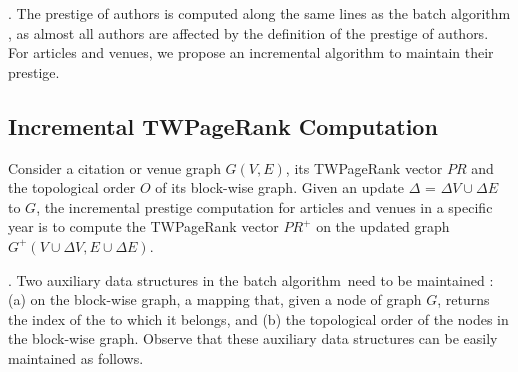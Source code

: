 .
The prestige of authors is computed along the same lines as the batch algorithm \batensemble,
as almost all authors are affected  by the definition of the prestige of authors.
%
For articles and venues, we propose an incremental algorithm to maintain their prestige.







\subsection{Incremental TWPageRank Computation}
\label{subsec-incTWPageRank-computation}





Consider a citation or venue graph $G(V, E)$, its TWPageRank vector $PR$ and the topological order $O$ of its block-wise graph. Given an update $\Delta$ = $\Delta V\cup\Delta E$ to $G$, the incremental prestige computation for articles and venues in a specific year is to compute the TWPageRank vector $PR^+$ on the updated graph $G^+(V\cup\Delta V, E\cup\Delta E)$.


.
Two auxiliary data structures in the batch algorithm~\twprscc need to be maintained : (a) on the block-wise graph,  a mapping that, given a node of graph $G$, returns the index of the \scc to which it belongs, and (b) the topological order of the nodes in the block-wise graph.
%
Observe that these auxiliary data structures can be easily maintained as follows.

